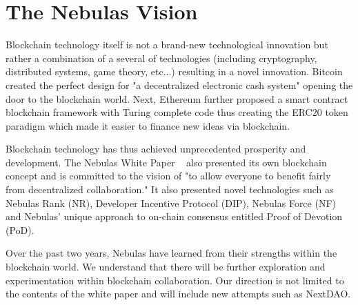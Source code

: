 \section {The Nebulas Vision}
Blockchain technology itself is not a brand-new technological innovation but rather a combination of a several of technologies (including cryptography, distributed systems, game theory, etc...) resulting in a novel innovation. Bitcoin ~\cite{Nakamoto2008} created the perfect design for "a decentralized electronic cash system" opening the door to the blockchain world. Next, Ethereum further proposed a smart contract blockchain framework with Turing complete code thus creating the ERC20 token paradigm which made it easier to finance new ideas via blockchain.

Blockchain technology has thus achieved unprecedented prosperity and development. The Nebulas White Paper ~\cite{TechWhitepaper} also presented its own blockchain concept and is committed to the vision of "to allow everyone to benefit fairly from decentralized collaboration." It also presented novel technologies such as Nebulas Rank (NR), Developer Incentive Protocol (DIP), Nebulas Force (NF) and Nebulas' unique approach to on-chain consensus entitled Proof of Devotion (PoD).

Over the past two years, Nebulas have learned from their strengths within the blockchain world. We understand that there will be further exploration and experimentation within blockchain collaboration. Our direction is not limited to the contents of the white paper and will include new attempts such as NextDAO.
